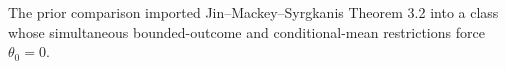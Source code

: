 The prior comparison imported Jin--Mackey--Syrgkanis Theorem 3.2 into a class whose simultaneous bounded-outcome and conditional-mean restrictions force \(\theta_0=0\).